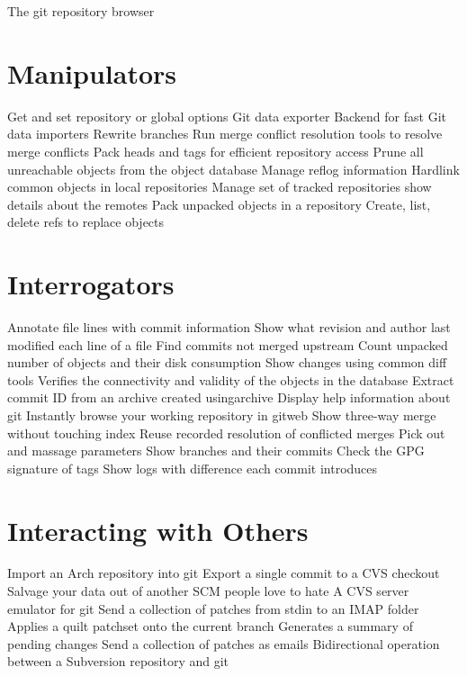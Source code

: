 	{The git repository browser}

\section{Manipulators}
	{Get and set repository or global options}
	{Git data exporter}
	{Backend for fast Git data importers}
	{Rewrite branches}
	{Run merge conflict resolution tools to resolve merge conflicts}
	{Pack heads and tags for efficient repository access}
	{Prune all unreachable objects from the object database}
	{Manage reflog information}
	{Hardlink common objects in local repositories}
	{Manage set of tracked repositories}
	{show details about the remotes}
	{Pack unpacked objects in a repository}
	{Create, list, delete refs to replace objects}

\section{Interrogators}
	{Annotate file lines with commit information}
	{\emergencystretch=5pt Show what revision and author last modified each line of a file}
	{Find commits not merged upstream}
	{Count unpacked number of objects and their disk consumption}
	{Show changes using common diff tools}
	{Verifies the connectivity and validity of the objects in the database}
	{Extract commit ID from an archive created usingarchive}
	{Display help information about git}
	{Instantly browse your working repository in gitweb}
	{Show three-way merge without touching index}
	{Reuse recorded resolution of conflicted merges}
	{Pick out and massage parameters}
	{Show branches and their commits}
	{Check the GPG signature of tags}
	{Show logs with difference each commit introduces}

\section{Interacting with Others}
	{Import an Arch repository into git}
	{Export a single commit to a CVS checkout}
	{Salvage your data out of another SCM people love to hate}
	{A CVS server emulator for git}
	{Send a collection of patches from stdin to an IMAP folder}
	{Applies a quilt patchset onto the current branch}
	{Generates a summary of pending chan\-ges}
	{Send a collection of patches as emails}
	{Bidirectional operation between a Subversion repository and git}

